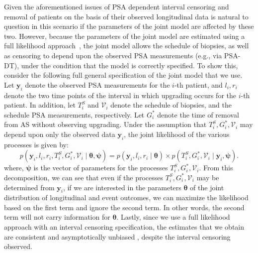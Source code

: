 \begin{subappendices}
Given the aforementioned issues of PSA dependent interval censoring and removal of patients on the basis of their observed longitudinal data is natural to question in this scenario if the parameters of the joint model are affected by these two. However, because the parameters of the joint model are estimated using a full likelihood approach~\citep{tsiatis2004joint}, the joint model allows the schedule of biopsies, as well as censoring to depend upon the observed PSA measurements (e.g., via PSA-DT), under the condition that the model is correctly specified. To show this, consider the following full general specification of the joint model that we use. Let $\boldsymbol{y}_i$ denote the observed PSA measurements for the $i$-th patient, and $l_i, r_i$ denote the two time points of the interval in which upgrading occurs for the $i$-th patient. In addition, let $T_i^S$ and $\mathcal{V}_i$ denote the schedule of biopsies, and the schedule PSA measurements, respectively. Let $G^*_i$ denote the time of removal from AS without observing upgrading. Under the assumption that $T_i^S, G^*_i, \mathcal{V}_i$ may depend upon only the observed data $\boldsymbol{y}_i$, the joint likelihood of the various processes is given by:
\begin{equation*}
p(\boldsymbol{y}_i, l_i, r_i, T_i^S, G^*_i, \mathcal{V}_i \mid \boldsymbol{\theta}, \boldsymbol{\psi}) = p(\boldsymbol{y}_i, l_i, r_i \mid \boldsymbol{\theta}) \times p(T_i^S, G^*_i, \mathcal{V}_i \mid \boldsymbol{y}_i, \boldsymbol{\psi}).
\end{equation*}
where, $\boldsymbol{\psi}$ is the vector of parameters for the processes $T_i^S, G^*_i, \mathcal{V}_i$. From this decomposition, we can see that even if the processes $T_i^S, G^*_i, \mathcal{V}_i$ may be determined from $\boldsymbol{y}_i$, if we are interested in the parameters $\boldsymbol{\theta}$ of the joint distribution of longitudinal and event outcomes, we can maximize the likelihood based on the first term and ignore the second term. In other words, the second term will not carry information for $\boldsymbol{\theta}$. Lastly, since we use a full likelihood approach with an interval censoring specification, the estimates that we obtain are consistent and asymptotically unbiased \citep{gentleman1994maximum}, despite the interval censoring observed. 


\end{subappendices}
